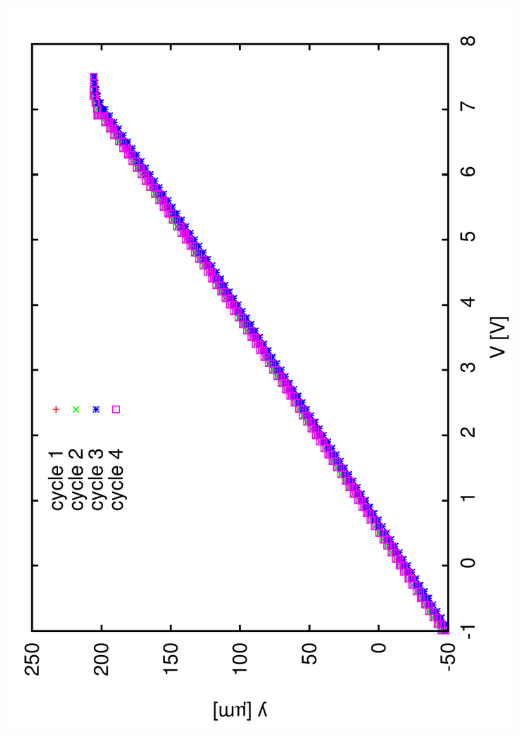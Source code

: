 \documentclass[a4paper,11pt]{book}
\begin{document}
\includegraphics[angle=-90,scale=0.15]{image22.pdf}
\end{document}
